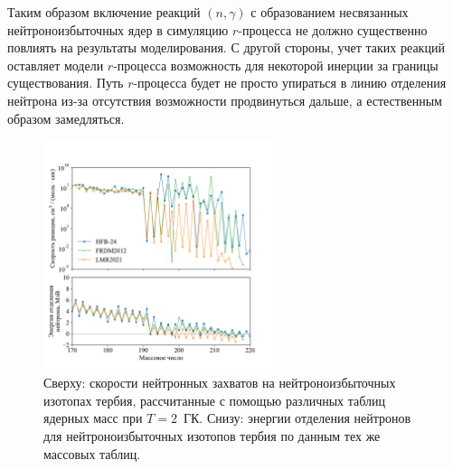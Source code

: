 Таким образом включение реакций $(n,\gamma)$ с образованием несвязанных нейтроноизбыточных ядер в симуляцию $r$-процесса не должно существенно повлиять на результаты моделирования. С другой стороны, учет таких реакций оставляет модели $r$-процесса возможность для некоторой инерции за границы существования. Путь $r$-процесса будет не просто упираться в линию отделения нейтрона из-за отсутствия возможности продвинуться дальше, а естественным образом замедляться.  

\begin{figure}
  \centering
  \includegraphics[width=0.6\textwidth]{../pics/rates_vs_A_tb.pdf}
  \caption{Сверху: скорости нейтронных захватов на нейтроноизбыточных изотопах тербия, рассчитанные с помощью различных таблиц ядерных масс при $T = 2$~ГК. Снизу: энергии отделения нейтронов для нейтроноизбыточных изотопов тербия по данным тех же массовых таблиц.}
  \label{fig:rates_vs_A}
\end{figure}

